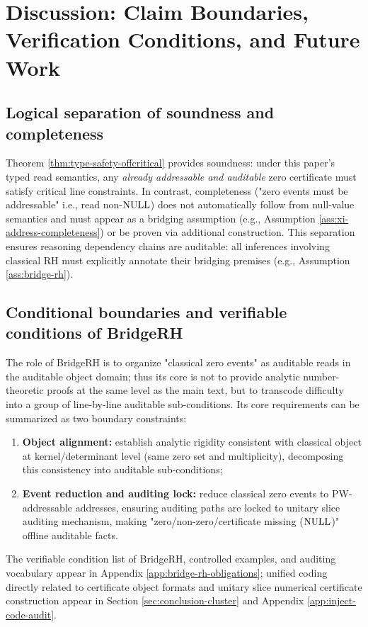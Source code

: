\section{Discussion: Claim Boundaries, Verification Conditions, and Future Work}

\subsection{Logical separation of soundness and completeness}
Theorem \ref{thm:type-safety-offcritical} provides soundness: under this paper's typed read semantics, any \emph{already addressable and auditable} zero certificate must satisfy critical line constraints. In contrast, completeness ("zero events must be addressable" i.e., read non-$\mathrm{NULL}$) does not automatically follow from null-value semantics and must appear as a bridging assumption (e.g., Assumption \ref{ass:xi-address-completeness}) or be proven via additional construction. This separation ensures reasoning dependency chains are auditable: all inferences involving classical RH must explicitly annotate their bridging premises (e.g., Assumption \ref{ass:bridge-rh}).\par

\subsection{Conditional boundaries and verifiable conditions of BridgeRH}
The role of BridgeRH is to organize "classical zero events" as auditable reads in the auditable object domain; thus its core is not to provide analytic number-theoretic proofs at the same level as the main text, but to transcode difficulty into a group of line-by-line auditable sub-conditions. Its core requirements can be summarized as two boundary constraints:
\begin{enumerate}
  \item \textbf{Object alignment:} establish analytic rigidity consistent with classical object at kernel/determinant level (same zero set and multiplicity), decomposing this consistency into auditable sub-conditions;
  \item \textbf{Event reduction and auditing lock:} reduce classical zero events to PW-addressable addresses, ensuring auditing paths are locked to unitary slice auditing mechanism, making "zero/non-zero/certificate missing ($\mathrm{NULL}$)" offline auditable facts.
\end{enumerate}
The verifiable condition list of BridgeRH, controlled examples, and auditing vocabulary appear in Appendix \ref{app:bridge-rh-obligations}; unified coding directly related to certificate object formats and unitary slice numerical certificate construction appear in Section \ref{sec:conclusion-cluster} and Appendix \ref{app:inject-code-audit}.\par

